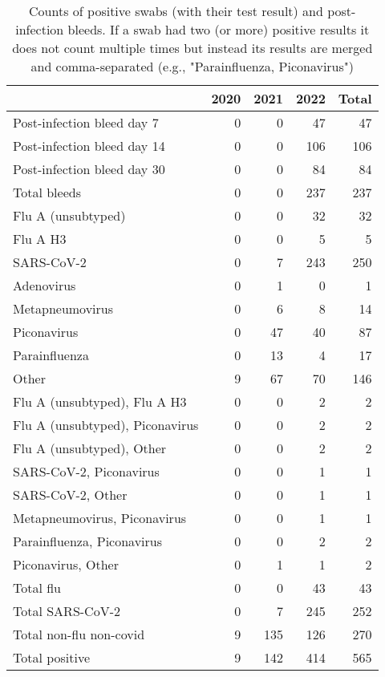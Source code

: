 \begin{table}

\caption{\label{tab:infection-counts}Counts of positive swabs (with their test result) and post-infection bleeds.
        If a swab had two (or more) positive results it does not count multiple times but instead its
        results are merged and comma-separated (e.g., "Parainfluenza, Piconavirus")}
\centering
\begin{tabular}[t]{lrrrr}
\toprule
  & 2020 & 2021 & 2022 & Total\\
\midrule
Post-infection bleed day 7 & 0 & 0 & 47 & 47\\
Post-infection bleed day 14 & 0 & 0 & 106 & 106\\
Post-infection bleed day 30 & 0 & 0 & 84 & 84\\
\addlinespace
Total bleeds & 0 & 0 & 237 & 237\\
\addlinespace
Flu A (unsubtyped) & 0 & 0 & 32 & 32\\
Flu A H3 & 0 & 0 & 5 & 5\\
\addlinespace
SARS-CoV-2 & 0 & 7 & 243 & 250\\
\addlinespace
Adenovirus & 0 & 1 & 0 & 1\\
Metapneumovirus & 0 & 6 & 8 & 14\\
Piconavirus & 0 & 47 & 40 & 87\\
Parainfluenza & 0 & 13 & 4 & 17\\
Other & 9 & 67 & 70 & 146\\
\addlinespace
Flu A (unsubtyped), Flu A H3 & 0 & 0 & 2 & 2\\
Flu A (unsubtyped), Piconavirus & 0 & 0 & 2 & 2\\
Flu A (unsubtyped), Other & 0 & 0 & 2 & 2\\
\addlinespace
SARS-CoV-2, Piconavirus & 0 & 0 & 1 & 1\\
SARS-CoV-2, Other & 0 & 0 & 1 & 1\\
\addlinespace
Metapneumovirus, Piconavirus & 0 & 0 & 1 & 1\\
Parainfluenza, Piconavirus & 0 & 0 & 2 & 2\\
Piconavirus, Other & 0 & 1 & 1 & 2\\
\addlinespace
Total flu & 0 & 0 & 43 & 43\\
Total SARS-CoV-2 & 0 & 7 & 245 & 252\\
Total non-flu non-covid & 9 & 135 & 126 & 270\\
\addlinespace
Total positive & 9 & 142 & 414 & 565\\
\bottomrule
\end{tabular}
\end{table}
